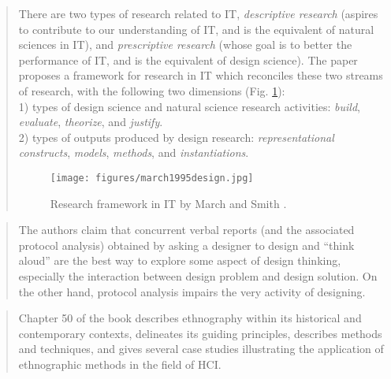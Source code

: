 		\begin{quote}
		\small
		There are two types of research related to IT, {\em descriptive research} (aspires
		to contribute to our understanding of IT, and is the equivalent of natural sciences in IT),
		and {\em prescriptive research} (whose goal is to better the performance of IT, and
		is the equivalent of design science).
		The paper proposes a framework for research in IT which reconciles these two streams of
		research, with the following two dimensions (Fig. \ref{fig:march1995design}):\\
		1) types of design science and natural science research activities:
		{\em build}, {\em evaluate}, {\em theorize}, and {\em justify}.\\
		2) types of outputs produced by design research: 
		{\em representational constructs}, {\em models}, {\em methods}, and {\em instantiations}. 
		\begin{figure}[htb]
		\begin{center}
		\texttt{[image: figures/march1995design.jpg]}
		\caption{Research framework in IT by March and Smith \cite{march1995design}.}
		\label{fig:march1995design}
		\end{center}
		\end{figure}		
		\end{quote}

		\begin{quote}
		\small
		The authors claim that concurrent verbal reports (and the associated protocol analysis) 
		obtained by asking a designer to design and ``think aloud'' 
		are the best way to explore some aspect of design thinking, especially the interaction 
		between design problem and design solution. On the other hand, protocol analysis 
		impairs the very activity of designing.
		\end{quote}


		\begin{quote}
		\small
		Chapter 50 of the book describes ethnography within its historical and contemporary contexts,
		delineates its guiding principles, describes methods and techniques, and
		gives several case studies illustrating the application of ethnographic methods
		in the field of HCI.
		\end{quote}

